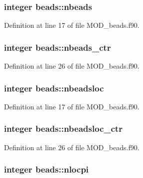 \hypertarget{classbeads_af2080ec4bc7bbcf0c79ecec326e1d09c}{
\subsubsection[{nbeads}]{\setlength{\rightskip}{0pt plus 5cm}integer beads\-::nbeads}}\label{classbeads_af2080ec4bc7bbcf0c79ecec326e1d09c}


Definition at line 17 of file M\-O\-D\-\_\-beads.\-f90.

\hypertarget{classbeads_a44efdcee98e53b88242fb574bf7a3fe1}{
\subsubsection[{nbeads\-\_\-ctr}]{\setlength{\rightskip}{0pt plus 5cm}integer beads\-::nbeads\-\_\-ctr}}\label{classbeads_a44efdcee98e53b88242fb574bf7a3fe1}


Definition at line 26 of file M\-O\-D\-\_\-beads.\-f90.

\hypertarget{classbeads_a249177398ee35c3836f0abb82eab8edd}{
\subsubsection[{nbeadsloc}]{\setlength{\rightskip}{0pt plus 5cm}integer beads\-::nbeadsloc}}\label{classbeads_a249177398ee35c3836f0abb82eab8edd}


Definition at line 17 of file M\-O\-D\-\_\-beads.\-f90.

\hypertarget{classbeads_ac980eb32841995e3c9bbd1aec69704fe}{
\subsubsection[{nbeadsloc\-\_\-ctr}]{\setlength{\rightskip}{0pt plus 5cm}integer beads\-::nbeadsloc\-\_\-ctr}}\label{classbeads_ac980eb32841995e3c9bbd1aec69704fe}


Definition at line 26 of file M\-O\-D\-\_\-beads.\-f90.

\hypertarget{classbeads_abbd73555d2a46563cbb9c68d402dc8cf}{
\subsubsection[{nlocpi}]{\setlength{\rightskip}{0pt plus 5cm}integer beads\-::nlocpi}}\label{classbeads_abbd73555d2a46563cbb9c68d402dc8cf}


